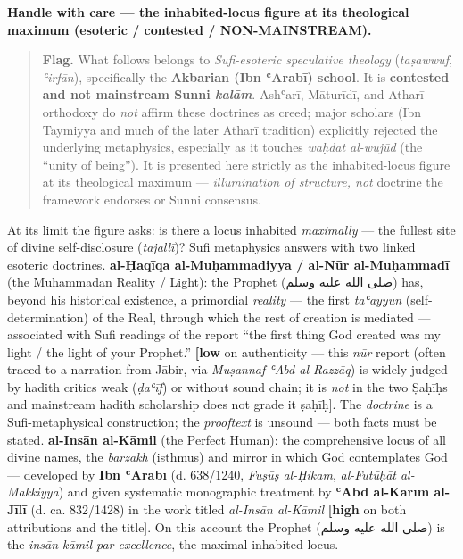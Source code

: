 \documentclass[11pt]{article}
\newcommand{\AR}[1]{{\arabicfont\beginR #1\endR}}
\begin{document}
\textbf{Handle with care — the inhabited-locus figure at its theological maximum (esoteric /\allowbreak{} contested /\allowbreak{} NON-MAINSTREAM).}

\begin{quote}
\textbf{Flag.} What follows belongs to \emph{Sufi-esoteric speculative theology} (\emph{taṣawwuf}, \emph{ʿirfān}), specifically the \textbf{Akbarian (Ibn ʿArabī) school}. It is \textbf{contested and not mainstream Sunni \emph{kalām}}. Ashʿarī, Māturīdī, and Atharī orthodoxy do \emph{not} affirm these doctrines as creed; major scholars (Ibn Taymiyya and much of the later Atharī tradition) explicitly rejected the underlying metaphysics, especially as it touches \emph{waḥdat al-wujūd} (the ``unity of being''). It is presented here strictly as the inhabited-locus figure at its theological maximum — \emph{illumination of structure, not} doctrine the framework endorses or Sunni consensus.
\end{quote}

At its limit the figure asks: is there a locus inhabited \emph{maximally} — the fullest site of divine self-disclosure (\emph{tajallī})? Sufi metaphysics answers with two linked esoteric doctrines. \textbf{al-Ḥaqīqa al-Muḥammadiyya /\allowbreak{} al-Nūr al-Muḥammadī} (the Muhammadan Reality /\allowbreak{} Light): the Prophet (\AR{صلى الله عليه وسلم}) has, beyond his historical existence, a primordial \emph{reality} — the first \emph{taʿayyun} (self-determination) of the Real, through which the rest of creation is mediated — associated with Sufi readings of the report ``the first thing God created was my light /\allowbreak{} the light of your Prophet.'' \textbf{[low} on authenticity — this \emph{nūr} report (often traced to a narration from Jābir, via \emph{Muṣannaf ʿAbd al-Razzāq}) is widely judged by hadith critics weak (\emph{ḍaʿīf}) or without sound chain; it is \emph{not} in the two Ṣaḥīḥs and mainstream hadith scholarship does not grade it ṣaḥīḥ]. The \emph{doctrine} is a Sufi-metaphysical construction; the \emph{prooftext} is unsound — both facts must be stated. \textbf{al-Insān al-Kāmil} (the Perfect Human): the comprehensive locus of all divine names, the \emph{barzakh} (isthmus) and mirror in which God contemplates God — developed by \textbf{Ibn ʿArabī} (d. 638/\allowbreak{}1240, \emph{Fuṣūṣ al-Ḥikam}, \emph{al-Futūḥāt al-Makkiyya}) and given systematic monographic treatment by \textbf{ʿAbd al-Karīm al-Jīlī} (d. ca. 832/\allowbreak{}1428) in the work titled \emph{al-Insān al-Kāmil} \textbf{[high} on both attributions and the title]. On this account the Prophet (\AR{صلى الله عليه وسلم}) is the \emph{insān kāmil par excellence}, the maximal inhabited locus.
\end{document}
